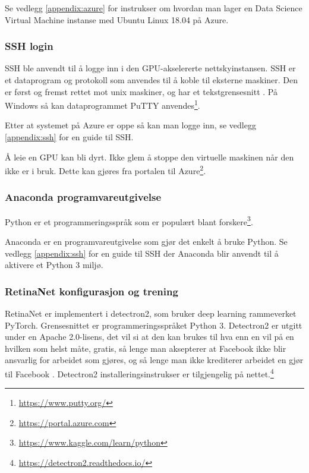 Se vedlegg \ref{appendix:azure} for instrukser om hvordan man lager en Data Science Virtual Machine instanse med Ubuntu Linux 18.04 på Azure.

\subsubsection{SSH login}

SSH ble anvendt til å logge inn i den GPU-akselererte nettskyinstansen. SSH er et dataprogram og protokoll som anvendes til å koble til eksterne maskiner. Den er først og fremst rettet mot unix maskiner, og har et tekstgrensesnitt \cite{Mallick m.fl. 2020}. På Windows så kan dataprogrammet PuTTY anvendes\footnote{\url{https://www.putty.org/}}.

Etter at systemet på Azure er oppe så kan man logge inn, se vedlegg \ref{appendix:ssh} for en guide til SSH.%

Å leie en GPU kan bli dyrt. Ikke glem å stoppe den virtuelle maskinen når den ikke er i bruk. Dette kan gjøres fra portalen til Azure\footnote{\url{https://portal.azure.com}}.


\subsubsection{Anaconda programvareutgivelse}

Python er et programmeringsspråk som er populært blant forskere\footnote{\url{https://www.kaggle.com/learn/python}}. \cite{Morris 2020}

Anaconda er en programvareutgivelse som gjør det enkelt å bruke Python. Se vedlegg \ref{appendix:ssh} for en guide til SSH der Anaconda blir anvendt til å aktivere et Python 3 miljø.

\subsubsection{RetinaNet konfigurasjon og trening}

RetinaNet er implementert i detectron2, som bruker deep learning rammeverket PyTorch. Grensesnittet er programmeringsspråket Python 3. Detectron2 er utgitt under en Apache 2.0-lisens, det vil si at den kan brukes til hva enn en vil på en hvilken som helst måte, gratis, så lenge man aksepterer at Facebook ikke blir ansvarlig for arbeidet som gjøres, og så lenge man ikke krediterer arbeidet en gjør til Facebook \cite{The Apache Software Foundation 2004}. Detectron2 installeringsinstrukser er tilgjengelig på nettet.\footnote{\url{https://detectron2.readthedocs.io/}}

